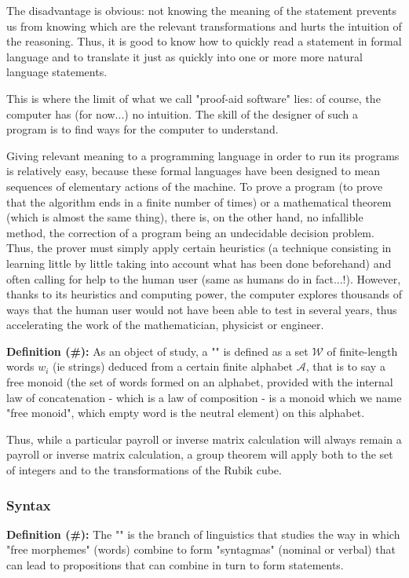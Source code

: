 	The disadvantage is obvious: not knowing the meaning of the statement prevents us from knowing which are the relevant transformations and hurts the intuition of the reasoning. Thus, it is good to know how to quickly read a statement in formal language and to translate it just as quickly into one or more more natural language statements.
	
	This is where the limit of what we call "proof-aid software" lies: of course, the computer has (for now...) no intuition. The skill of the designer of such a program is to find ways for the computer to understand.

	Giving relevant meaning to a programming language in order to run its programs is relatively easy, because these formal languages have been designed to mean sequences of elementary actions of the machine. To prove a program (to prove that the algorithm ends in a finite number of times) or a mathematical theorem (which is almost the same thing), there is, on the other hand, no infallible method, the correction of a program being an undecidable decision problem. Thus, the prover must simply apply certain heuristics (a technique consisting in learning little by little taking into account what has been done beforehand) and often calling for help to the human user (same as humans do in fact...!). However, thanks to its heuristics and computing power, the computer explores thousands of ways that the human user would not have been able to test in several years, thus accelerating the work of the mathematician, physicist or engineer.
	
	\textbf{Definition (\#\mydef):} As an object of study, a "" is defined as a set $\mathcal{W}$ of finite-length words $w_i$ (ie strings) deduced from a certain finite alphabet $\mathcal{A}$, that is to say a free monoid (the set of words formed on an alphabet, provided with the internal law of concatenation - which is a law of composition - is a monoid which we name "free monoid", which empty word is the neutral element) on this alphabet.
	
	\begin{tcolorbox}[title=Remark,colframe=black,arc=10pt]
	Thus, while a particular payroll or inverse matrix calculation will always remain a payroll or inverse matrix calculation, a group theorem will apply both to the set of integers and to the transformations of the Rubik cube.
	\end{tcolorbox}
	
	\subsubsection{Syntax}
	\textbf{Definition (\#\mydef):} The "" is the branch of linguistics that studies the way in which "free morphemes" (words) combine to form "syntagmas" (nominal or verbal) that can lead to propositions that can combine in turn to form statements.
	
